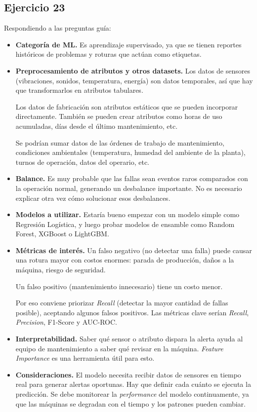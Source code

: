 \documentclass[a4paper,12pt]{article}
\begin{document}
        \subsection*{Ejercicio 23}
            \noindent Respondiendo a las preguntas guía:
            \begin{itemize}
                \item \textbf{Categoría de ML.} Es aprendizaje supervisado, ya que se tienen reportes históricos de problemas y roturas que actúan como etiquetas. 
                \item \textbf{Preprocesamiento de atributos y otros datasets.} Los datos de sensores (vibraciones, sonidos, temperatura, energía) son datos temporales, así que hay que transformarlos en atributos tabulares.

                    Los datos de fabricación son atributos estáticos que se pueden incorporar directamente. También se pueden crear atributos como horas de uso acumuladas, días desde el último mantenimiento, etc.

                    Se podrían sumar datos de las órdenes de trabajo de mantenimiento, condiciones ambientales (temperatura, humedad del ambiente de la planta), turnos de operación, datos del operario, etc.
                \item \textbf{Balance.} Es muy probable que las fallas sean eventos raros comparados con la operación normal, generando un desbalance importante. No es necesario explicar otra vez cómo solucionar esos desbalances.
                \item \textbf{Modelos a utilizar.} Estaría bueno empezar con un modelo simple como Regresión Logística, y luego probar modelos de ensamble como Random Forest, XGBoost o LightGBM.
                \item \textbf{Métricas de interés.} Un falso negativo (no detectar una falla) puede causar una rotura mayor con costos enormes: parada de producción, daños a la máquina, riesgo de seguridad. 

                    Un falso positivo (mantenimiento innecesario) tiene un costo menor. 

                    Por eso conviene priorizar \textit{Recall} (detectar la mayor cantidad de fallas posible), aceptando algunos falsos positivos. Las métricas clave serían \textit{Recall}, \textit{Precision}, F1-Score y AUC-ROC.
                \item \textbf{Interpretabilidad.} Saber qué sensor o atributo dispara la alerta ayuda al equipo de mantenimiento a saber qué revisar en la máquina. \textit{Feature Importance} es una herramienta útil para esto.
                \item \textbf{Consideraciones.} El modelo necesita recibir datos de sensores en tiempo real para generar alertas oportunas.
                    Hay que definir cada cuánto se ejecuta la predicción. Se debe monitorear la \textit{performance} del modelo continuamente, ya que las máquinas se degradan con el tiempo y los patrones pueden cambiar.
            \end{itemize}
\end{document}
